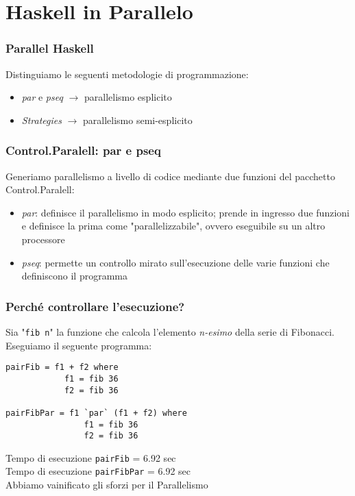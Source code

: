 \documentclass[14pt]{beamer}
\begin{document}

\section{Haskell in Parallelo}

\begin{frame}
\frametitle{Parallel Haskell}
Distinguiamo le seguenti metodologie di programmazione:
\begin{itemize}
\item \textit{par} e \textit{pseq} $\rightarrow$ parallelismo esplicito
\item \textit{Strategies} $\rightarrow$ parallelismo semi-esplicito
\end{itemize}
\end{frame}



\begin{frame}
\frametitle{Control.Paralell: par e pseq}
Generiamo parallelismo a livello di codice mediante due funzioni del pacchetto Control.Paralell:
\begin{itemize}
\item \textit{par}: definisce il parallelismo in modo esplicito; prende in ingresso due funzioni e definisce la prima come "parallelizzabile", ovvero eseguibile su un altro processore
\item \textit{pseq}: permette un controllo mirato sull'esecuzione delle varie funzioni che definiscono il programma
\end{itemize}
\end{frame}


\begin{frame}[fragile]
\frametitle{Perché controllare l'esecuzione?}
Sia "\texttt{fib n}" la funzione che calcola l'elemento \textit{n-esimo} della serie di Fibonacci. Eseguiamo il seguente programma:
\begin{verbatim}
pairFib = f1 + f2 where
    		f1 = fib 36
    		f2 = fib 36
    
pairFibPar = f1 `par` (f1 + f2) where
    			f1 = fib 36
    			f2 = fib 36
\end{verbatim}
\end{frame}



\begin{frame}
Tempo di esecuzione \texttt{pairFib} = 6.92 sec\\
Tempo di esecuzione \texttt{pairFibPar} = 6.92 sec\\
Abbiamo vainificato gli sforzi per il Parallelismo\\
\end{frame}
\end{document}
